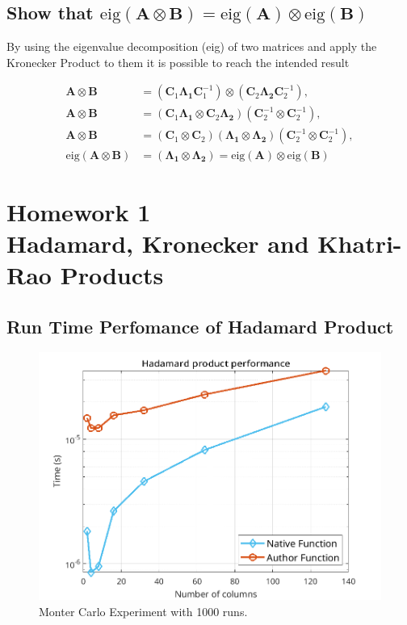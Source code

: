\documentclass[a4paper,10pt]{article}
\begin{document}
    \subsection*{Show that $\text{eig}(\boldsymbol{A} \otimes \boldsymbol{B}) = \text{eig}(\boldsymbol{A}) \otimes \text{eig}(\boldsymbol{B})$}

    By using the eigenvalue decomposition (eig) of two matrices and apply the Kronecker Product to them it is possible to reach the intended result

    \begin{align}
        \boldsymbol{A} \otimes \boldsymbol{B} &= (\boldsymbol{C}_{1} \boldsymbol{\Lambda_{1}} \boldsymbol{C}^{-1}_{1}) \otimes (\boldsymbol{C}_{2} \boldsymbol{\Lambda_{2}} \boldsymbol{C}^{-1}_{2}), \\
        \boldsymbol{A} \otimes \boldsymbol{B} &= (\boldsymbol{C}_{1} \boldsymbol{\Lambda_{1}} \otimes \boldsymbol{C}_{2} \boldsymbol{\Lambda_{2}}) (\boldsymbol{C}^{-1}_{2} \otimes \boldsymbol{C}^{-1}_{2}), \\
        \boldsymbol{A} \otimes \boldsymbol{B} &= (\boldsymbol{C}_{1} \otimes \boldsymbol{C}_{2}) (\boldsymbol{\Lambda_{1}} \otimes \boldsymbol{\Lambda_{2}}) (\boldsymbol{C}^{-1}_{2} \otimes \boldsymbol{C}^{-1}_{2}), \\
        \text{eig}(\boldsymbol{A} \otimes \boldsymbol{B}) &= (\boldsymbol{\Lambda_{1}} \otimes \boldsymbol{\Lambda_{2}}) = \text{eig}(\boldsymbol{A}) \otimes \text{eig}(\boldsymbol{B}) 
    \end{align}

\newpage
\section*{Homework 1 \\ Hadamard, Kronecker and Khatri-Rao Products}

    \subsection*{Run Time Perfomance of Hadamard Product}

    \begin{figure}[ht!]
        \centering 
        \includegraphics[width=0.75\linewidth]{figs/hw1a1.png} \par 
        \caption{Monter Carlo Experiment with 1000 runs.}
        \label{fig:hw1a1} 
    \end{figure}
\end{document}
